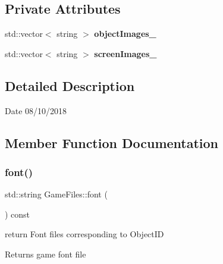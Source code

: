 \subsection*{Private Attributes}
\begin{DoxyCompactItemize}
\item 
\mbox{\label{class_game_files_a7dabda22cc24f553fa8c663578eb316c}} 
std\+::vector$<$ string $>$ {\bfseries object\+Images\+\_\+}
\item 
\mbox{\label{class_game_files_a5542d6e3b5e847838173ab2c1ce54c76}} 
std\+::vector$<$ string $>$ {\bfseries screen\+Images\+\_\+}
\end{DoxyCompactItemize}


\subsection{Detailed Description}
\begin{DoxyDate}{Date}
08/10/2018 
\end{DoxyDate}


\subsection{Member Function Documentation}
\mbox{\label{class_game_files_ac9c59e01a8a7a5ea98852fb69a76bd1e}} 
\subsubsection{\texorpdfstring{font()}{font()}}
{\footnotesize\ttfamily std\+::string Game\+Files\+::font (\begin{DoxyParamCaption}{ }\end{DoxyParamCaption}) const}



return Font files corresponding to Object\+ID 

\begin{DoxyReturn}{Returns}
game font file 
\end{DoxyReturn}
\mbox{\label{class_game_files_a44e04f4099034508077b8facfb99b829}} 
